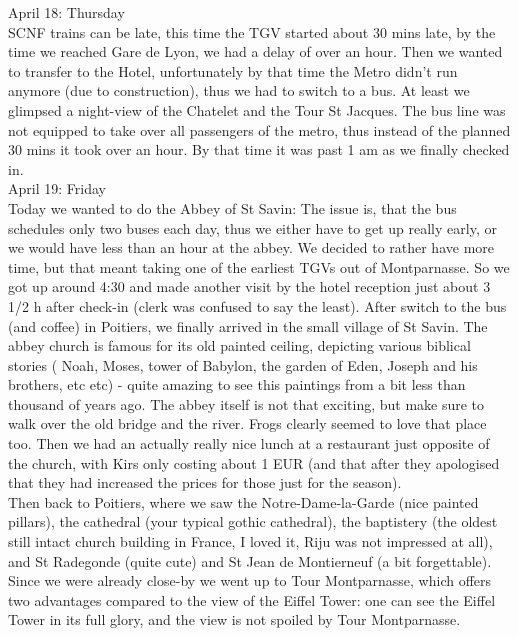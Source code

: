 April 18: Thursday\\
SCNF trains can be late, this time the TGV started about 30 mins late, by the time we reached Gare de Lyon, we had a delay of over an hour. Then we wanted to transfer to the Hotel, unfortunately by that time the Metro didn't run anymore (due to construction), thus we had to switch to a bus. At least we glimpsed a night-view of the Chatelet and the Tour St Jacques. The bus line was not equipped to take over all passengers of the metro, thus instead of the planned 30 mins it took over an hour. By that time it was past 1 am as we finally checked in.\\

April 19: Friday\\
Today we wanted to do the Abbey of St Savin: The issue is, that the bus schedules only two buses each day, thus we either have to get up really early, or we would have less than an hour at the abbey. We decided to rather have more time, but that meant taking one of the earliest TGVs out of Montparnasse. So we got up around 4:30 and made another visit by the hotel reception just about 3 1/2 h after check-in (clerk was confused to say the least). After switch to the bus (and coffee) in Poitiers, we finally arrived in the small village of St Savin. The abbey church is famous for its old painted ceiling, depicting various biblical stories ( Noah, Moses, tower of Babylon, the garden of Eden, Joseph and his brothers, etc etc) - quite amazing to see this paintings from a bit less than thousand of years ago. The abbey itself is not that exciting, but make sure to walk over the old bridge and the river. Frogs clearly seemed to love that place too. Then we had an actually really nice lunch at a restaurant just opposite of the church, with Kirs only costing about 1 EUR (and that after they apologised that they had increased the prices for those just for the season). \\
Then back to Poitiers, where we saw the Notre-Dame-la-Garde (nice painted pillars), the cathedral (your typical gothic cathedral), the baptistery (the oldest still intact church building in France, I loved it, Riju was not impressed at all), and St Radegonde (quite cute) and St Jean de Montierneuf (a bit forgettable). Since we were already close-by we went up to Tour Montparnasse, which offers two advantages compared to the view of the Eiffel Tower: one can see the Eiffel Tower in its full glory, and the view is not spoiled by Tour Montparnasse. \\

